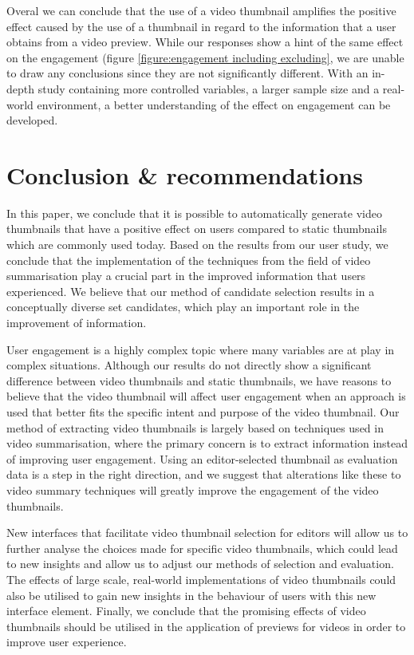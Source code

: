 \documentclass{../resources/sig-alternate-05-2015}
\begin{document}
Overal we can conclude that the use of a video thumbnail amplifies the positive effect caused by the use of a thumbnail in regard to the information that a user obtains from a video preview. While our responses show a hint of the same effect on the engagement (figure \ref{figure:engagement including excluding}, we are unable to draw any conclusions since they are not significantly different. With an in-depth study containing more controlled variables, a larger sample size and a real-world environment, a better understanding of the effect on engagement can be developed.

\section{Conclusion \& recommendations}

In this paper, we conclude that it is possible to automatically generate video thumbnails that have a positive effect on users compared to static thumbnails which are commonly used today. Based on the results from our user study, we conclude that the implementation of the techniques from the field of video summarisation play a crucial part in the improved information that users experienced. We believe that our method of candidate selection results in a conceptually diverse set candidates, which play an important role in the improvement of information.

User engagement is a highly complex topic where many variables are at play in complex situations. Although our results do not directly show a significant difference between video thumbnails and static thumbnails, we have reasons to believe that the video thumbnail will affect user engagement when an approach is used that better fits the specific intent and purpose of the video thumbnail. Our method of extracting video thumbnails is largely based on techniques used in video summarisation, where the primary concern is to extract information instead of improving user engagement. Using an editor-selected thumbnail as evaluation data is a step in the right direction, and we suggest that alterations like these to video summary techniques will greatly improve the engagement of the video thumbnails.

New interfaces that facilitate video thumbnail selection for editors will allow us to further analyse the choices made for specific video thumbnails, which could lead to new insights and allow us to adjust our methods of selection and evaluation. The effects of large scale, real-world implementations of video thumbnails could also be utilised to gain new insights in the behaviour of users with this new interface element. Finally, we conclude that the promising effects of video thumbnails should be utilised in the application of previews for videos in order to improve user experience.
\end{document}
